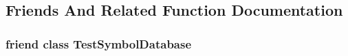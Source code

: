 \subsection{Friends And Related Function Documentation}
\hypertarget{class_scope_afbc7132e3aa10bdc3945e17caa6d6879}{
\subsubsection[{Test\-Symbol\-Database}]{\setlength{\rightskip}{0pt plus 5cm}friend class {\bf Test\-Symbol\-Database}\hspace{0.3cm}{\ttfamily [friend]}}}\label{class_scope_afbc7132e3aa10bdc3945e17caa6d6879}


